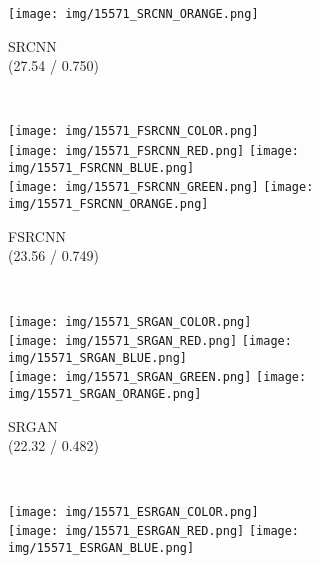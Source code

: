 \documentclass[10pt,twocolumn,letterpaper]{article}
\begin{document}
\begin{figure*}[t]
\begin{center}
\begin{subfigure}[b]{\SizeFigCompareHRLarge\textwidth}
        \texttt{[image: img/15571\_SRCNN\_ORANGE.png]}
        \caption{SRCNN~\cite{dong2015image} \\ (27.54 / 0.750)}
        \label{fig:SRCNN}
    \end{subfigure}
    ~
    \begin{subfigure}[b]{\SizeFigCompareHRLarge\textwidth}
        \texttt{[image: img/15571\_FSRCNN\_COLOR.png]}
        \\
        \texttt{[image: img/15571\_FSRCNN\_RED.png]}
        \texttt{[image: img/15571\_FSRCNN\_BLUE.png]}
        \\
        \texttt{[image: img/15571\_FSRCNN\_GREEN.png]}
        \texttt{[image: img/15571\_FSRCNN\_ORANGE.png]}
        \caption{FSRCNN~\cite{dong2015image} \\ (23.56 / 0.749)}
        \label{fig:FSRCNN}
    \end{subfigure}
    ~
    \begin{subfigure}[b]{\SizeFigCompareHRLarge\textwidth}
        \texttt{[image: img/15571\_SRGAN\_COLOR.png]}
        \\
        \texttt{[image: img/15571\_SRGAN\_RED.png]}
        \texttt{[image: img/15571\_SRGAN\_BLUE.png]}
        \\
        \texttt{[image: img/15571\_SRGAN\_GREEN.png]}
        \texttt{[image: img/15571\_SRGAN\_ORANGE.png]}
        \caption{SRGAN~\cite{ledig2017photo} \\ (22.32 / 0.482)} 
        \label{fig:SRGAN}
    \end{subfigure}
    \\ 
    \begin{subfigure}[b]{\SizeFigCompareHRLarge\textwidth}
        \texttt{[image: img/15571\_ESRGAN\_COLOR.png]}
        \\
        \texttt{[image: img/15571\_ESRGAN\_RED.png]}
        \texttt{[image: img/15571\_ESRGAN\_BLUE.png]}

\end{subfigure}
\end{center}
\end{figure*}
\end{document}
